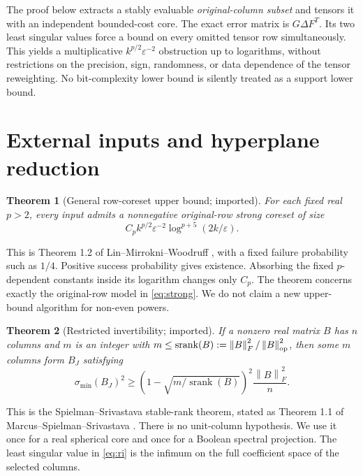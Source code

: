 \documentclass[11pt]{article}
\newtheorem{theorem}{Theorem}[section]
\theoremstyle{remark}\newtheorem{remark}[theorem]{Remark}
\newcommand{\eps}{\varepsilon}\newcommand{\norm}[1]{\left\|#1\right\|}
\newcommand{\srank}{\operatorname{srank}}\newcommand{\cost}{\operatorname{cost}}
\begin{document}
The proof below extracts a stably evaluable \emph{original-column subset} and tensors it with an independent bounded-cost core. The exact error matrix is $G\Delta F^T$. Its two least singular values force a bound on every omitted tensor row simultaneously. This yields a multiplicative $k^{p/2}\eps^{-2}$ obstruction up to logarithms, without restrictions on the precision, sign, randomness, or data dependence of the tensor reweighting. No bit-complexity lower bound is silently treated as a support lower bound.

\section{External inputs and hyperplane reduction}\label{sec:imports}
\begin{theorem}[General row-coreset upper bound; imported]\label{thm:upper}
For each fixed real $p>2$, every input admits a nonnegative original-row strong coreset of size
\[
 C_p k^{p/2}\eps^{-2}\log^{p+5}(2k/\eps).
\]
\end{theorem}
This is Theorem 1.2 of Lin--Mirrokni--Woodruff \cite{lmw}, with a fixed failure probability such as $1/4$. Positive success probability gives existence. Absorbing the fixed $p$-dependent constants inside its logarithm changes only $C_p$. The theorem concerns exactly the original-row model in \eqref{eq:strong}. We do not claim a new upper-bound algorithm for non-even powers.

\begin{theorem}[Restricted invertibility; imported]\label{thm:ri}
If a nonzero real matrix $B$ has $n$ columns and $m$ is an integer with
$m\le\srank(B):=\norm B_F^2/\norm B_{\op}^2$, then some $m$ columns form $B_J$ satisfying
\begin{equation}\label{eq:ri}
 \sigma_{\min}(B_J)^2\ge
 \left(1-\sqrt{m/\srank(B)}\right)^2\frac{\norm B_F^2}{n}.
\end{equation}
\end{theorem}
This is the Spielman--Srivastava stable-rank theorem, stated as Theorem 1.1 of Marcus--Spielman--Srivastava \cite{mss}. There is no unit-column hypothesis. We use it once for a real spherical core and once for a Boolean spectral projection. The least singular value in \eqref{eq:ri} is the infimum on the full coefficient space of the selected columns.
\end{document}
